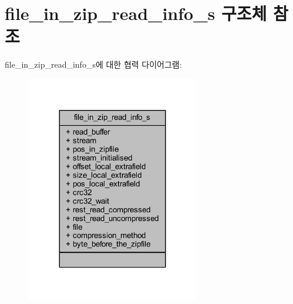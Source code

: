 \hypertarget{structfile__in__zip__read__info__s}{}\section{file\+\_\+in\+\_\+zip\+\_\+read\+\_\+info\+\_\+s 구조체 참조}
\label{structfile__in__zip__read__info__s}


file\+\_\+in\+\_\+zip\+\_\+read\+\_\+info\+\_\+s에 대한 협력 다이어그램\+:\nopagebreak
\begin{figure}[H]
\begin{center}
\leavevmode
\includegraphics[width=215pt]{structfile__in__zip__read__info__s__coll__graph}
\end{center}
\end{figure}
